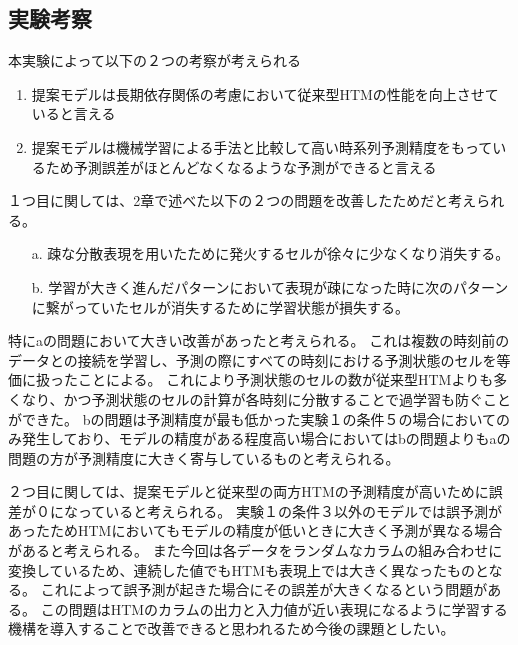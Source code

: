 \newpage
\vspace{3cm}
\subsection{実験考察}
本実験によって以下の２つの考察が考えられる
\begin{enumerate}
  \item 提案モデルは長期依存関係の考慮において従来型HTMの性能を向上させていると言える
  \item 提案モデルは機械学習による手法と比較して高い時系列予測精度をもっているため予測誤差がほとんどなくなるような予測ができると言える
\end{enumerate}
１つ目に関しては、2章で述べた以下の２つの問題を改善したためだと考えられる。
\begin{itemize}
  \item[a.] 疎な分散表現を用いたために発火するセルが徐々に少なくなり消失する。
  \item[b.] 学習が大きく進んだパターンにおいて表現が疎になった時に次のパターンに繋がっていたセルが消失するために学習状態が損失する。
\end{itemize}
特にaの問題において大きい改善があったと考えられる。
これは複数の時刻前のデータとの接続を学習し、予測の際にすべての時刻における予測状態のセルを等価に扱ったことによる。
これにより予測状態のセルの数が従来型HTMよりも多くなり、かつ予測状態のセルの計算が各時刻に分散することで過学習も防ぐことができた。
bの問題は予測精度が最も低かった実験１の条件５の場合においてのみ発生しており、モデルの精度がある程度高い場合においてはbの問題よりもaの問題の方が予測精度に大きく寄与しているものと考えられる。

２つ目に関しては、提案モデルと従来型の両方HTMの予測精度が高いために誤差が０になっていると考えられる。
実験１の条件３以外のモデルでは誤予測があったためHTMにおいてもモデルの精度が低いときに大きく予測が異なる場合があると考えられる。
また今回は各データをランダムなカラムの組み合わせに変換しているため、連続した値でもHTMも表現上では大きく異なったものとなる。
これによって誤予測が起きた場合にその誤差が大きくなるという問題がある。
この問題はHTMのカラムの出力と入力値が近い表現になるように学習する機構を導入することで改善できると思われるため今後の課題としたい。
